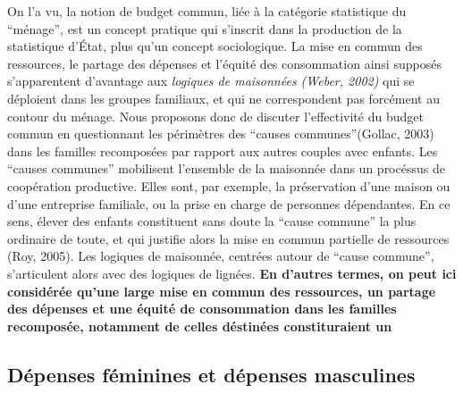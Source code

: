 \documentclass[
  12pt,
]{book}
\begin{document}
On l'a vu, la notion de budget commun, liée à la catégorie statistique
du ``ménage'', est un concept pratique qui s'inscrit dans la production
de la statistique d'État, plus qu'un concept sociologique. La mise en
commun des ressources, le partage des dépenses et l'équité des
consommation ainsi supposés s'apparentent d'avantage aux \emph{logiques
de maisonnées (Weber, 2002)} qui se déploient dans les groupes
familiaux, et qui ne correspondent pas forcément au contour du ménage.
Nous proposons donc de discuter l'effectivité du budget commun en
questionnant les périmètres des ``causes communes''(Gollac, 2003) dans
les familles recomposées par rapport aux autres couples avec enfants.
Les ``causes communes'' mobilisent l'ensemble de la maisonnée dans un
procéssus de coopération productive. Elles sont, par exemple, la
préservation d'une maison ou d'une entreprise familiale, ou la prise en
charge de personnes dépendantes. En ce sens, élever des enfants
constituent sans doute la ``cause commune'' la plus ordinaire de toute,
et qui justifie alors la mise en commun partielle de ressources (Roy,
2005). Les logiques de maisonnée, centrées autour de ``cause commune'',
s'articulent alors avec des logiques de lignées. \textbf{En d'autres
termes, on peut ici considérée qu'une large mise en commun des
ressources, un partage des dépenses et une équité de consommation dans
les familles recomposée, notamment de celles déstinées constituraient
un}

\subsection{Dépenses féminines et dépenses
masculines}\label{duxe9penses-fuxe9minines-et-duxe9penses-masculines}
\end{document}
